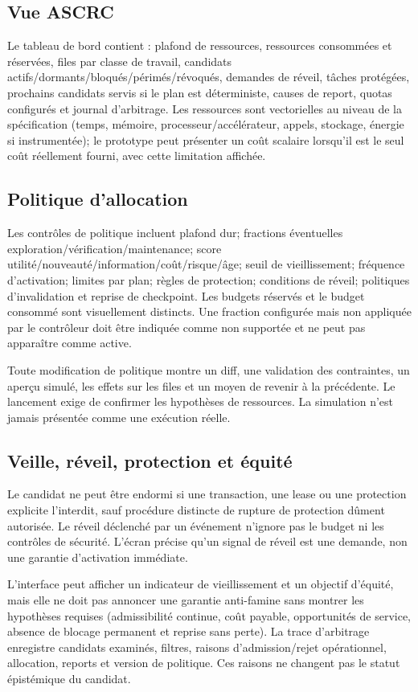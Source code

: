 \documentclass[11pt,a4paper]{article}
\begin{document}
\subsection{Vue ASCRC}
Le tableau de bord contient : plafond de ressources, ressources consommées et réservées, files par classe de travail, candidats actifs/dormants/bloqués/périmés/révoqués, demandes de réveil, tâches protégées, prochains candidats servis si le plan est déterministe, causes de report, quotas configurés et journal d'arbitrage. Les ressources sont vectorielles au niveau de la spécification (temps, mémoire, processeur/accélérateur, appels, stockage, énergie si instrumentée); le prototype peut présenter un coût scalaire lorsqu'il est le seul coût réellement fourni, avec cette limitation affichée.

\subsection{Politique d'allocation}
Les contrôles de politique incluent plafond dur; fractions éventuelles exploration/vérification/maintenance; score utilité/nouveauté/information/coût/risque/âge; seuil de vieillissement; fréquence d'activation; limites par plan; règles de protection; conditions de réveil; politiques d'invalidation et reprise de checkpoint. Les budgets réservés et le budget consommé sont visuellement distincts. Une fraction configurée mais non appliquée par le contrôleur doit être indiquée comme non supportée et ne peut pas apparaître comme active.

Toute modification de politique montre un diff, une validation des contraintes, un aperçu simulé, les effets sur les files et un moyen de revenir à la précédente. Le lancement exige de confirmer les hypothèses de ressources. La simulation n'est jamais présentée comme une exécution réelle.

\subsection{Veille, réveil, protection et équité}
Le candidat ne peut être endormi si une transaction, une lease ou une protection explicite l'interdit, sauf procédure distincte de rupture de protection dûment autorisée. Le réveil déclenché par un événement n'ignore pas le budget ni les contrôles de sécurité. L'écran précise qu'un signal de réveil est une demande, non une garantie d'activation immédiate.

L'interface peut afficher un indicateur de vieillissement et un objectif d'équité, mais elle ne doit pas annoncer une garantie anti-famine sans montrer les hypothèses requises (admissibilité continue, coût payable, opportunités de service, absence de blocage permanent et reprise sans perte). La trace d'arbitrage enregistre candidats examinés, filtres, raisons d'admission/rejet opérationnel, allocation, reports et version de politique. Ces raisons ne changent pas le statut épistémique du candidat.
\end{document}
